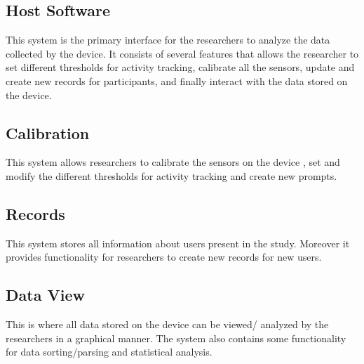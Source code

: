 \documentclass{article}
\begin{document}
\subsection{Host Software}
This system is the primary interface for the researchers to analyze the data collected by the device. It consists of several features that allows the researcher to set different
thresholds for activity tracking, calibrate all the sensors, update and create new records for participants, and finally interact with the data stored on the device.

\subsection{Calibration}
This system allows researchers to calibrate the sensors on the device , set and modify the different thresholds for activity tracking and create new prompts.

\subsection{Records}
This system stores all information about users present in the study. Moreover it provides functionality for researchers to create new records for new users.

\subsection{Data View}
This is where all data stored on the device can be viewed/ analyzed by the researchers in a graphical manner. The system also contains some functionality for data sorting/parsing and statistical analysis.
\end{document}
